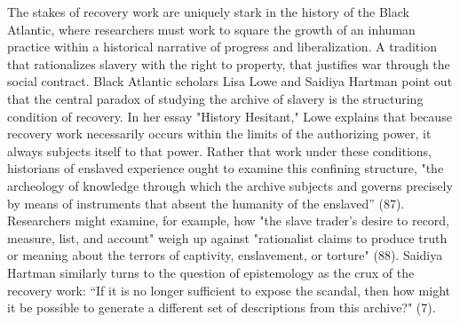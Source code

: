 \documentclass[11pt]{article}
\begin{document}
The stakes of recovery work are uniquely stark in the history of the
Black Atlantic, where researchers must work to square the growth of an
inhuman practice within a historical narrative of progress and
liberalization. A tradition that rationalizes slavery with the right
to property, that justifies war through the social contract. Black
Atlantic scholars Lisa Lowe and Saidiya Hartman point out that the
central paradox of studying the archive of slavery is the structuring
condition of recovery. In her essay "History Hesitant," Lowe explains
that because recovery work necessarily occurs within the limits of the
authorizing power, it always subjects itself to that power. Rather
that work under these conditions, historians of enslaved experience
ought to examine this confining structure, "the archeology of
knowledge through which the archive subjects and governs precisely by
means of instruments that absent the humanity of the enslaved”
(87). Researchers might examine, for example, how "the slave trader’s
desire to record, measure, list, and account" weigh up against
"rationalist claims to produce truth or meaning about the terrors of
captivity, enslavement, or torture" (88). Saidiya Hartman similarly
turns to the question of epistemology as the crux of the recovery
work: “If it is no longer sufficient to expose the scandal, then how
might it be possible to generate a different set of descriptions from
this archive?" (7).
\end{document}
